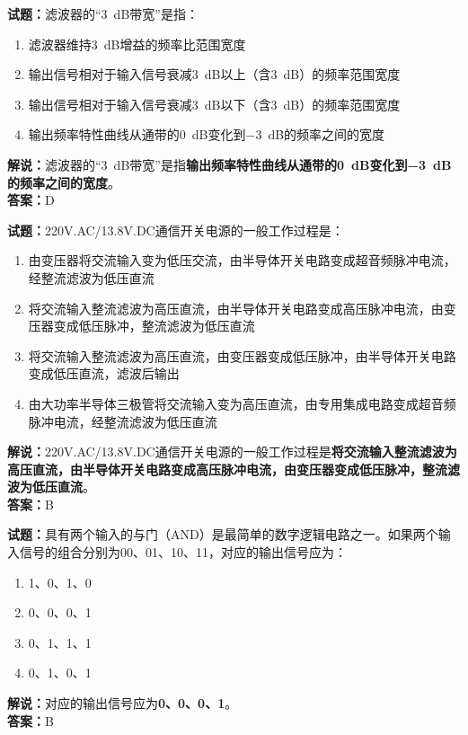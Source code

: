 \documentclass{ctexbook}
\begin{document}
\textbf{试题：}滤波器的“\SI{3}{\dB}带宽”是指：
\begin{enumerate}[leftmargin=3em]
  \item 滤波器维持\SI{3}{\dB}增益的频率比范围宽度
  \item 输出信号相对于输入信号衰减\SI{3}{\dB}以上（含\SI{3}{\dB}）的频率范围宽度
  \item 输出信号相对于输入信号衰减\SI{3}{\dB}以下（含\SI{3}{\dB}）的频率范围宽度
  \item 输出频率特性曲线从通带的\SI{0}{\dB}变化到\SI{-3}{\dB}的频率之间的宽度
\end{enumerate}
\noindent\textbf{解说：}滤波器的“\SI{3}{\dB}带宽”是指\textbf{输出频率特性曲线从通带的\SI{0}{\dB}变化到\SI{-3}{\dB}的频率之间的宽度}。\\\noindent\textbf{答案：}D

\vspace{1em}

\textbf{试题：}220V.AC/13.8V.DC通信开关电源的一般工作过程是：
\begin{enumerate}[leftmargin=3em]
  \item 由变压器将交流输入变为低压交流，由半导体开关电路变成超音频脉冲电流，经整流滤波为低压直流
  \item 将交流输入整流滤波为高压直流，由半导体开关电路变成高压脉冲电流，由变压器变成低压脉冲，整流滤波为低压直流
  \item 将交流输入整流滤波为高压直流，由变压器变成低压脉冲，由半导体开关电路变成低压直流，滤波后输出
  \item 由大功率半导体三极管将交流输入变为高压直流，由专用集成电路变成超音频脉冲电流，经整流滤波为低压直流
\end{enumerate}
\noindent\textbf{解说：}220V.AC/13.8V.DC通信开关电源的一般工作过程是\textbf{将交流输入整流滤波为高压直流，由半导体开关电路变成高压脉冲电流，由变压器变成低压脉冲，整流滤波为低压直流}。\\\noindent\textbf{答案：}B

\vspace{1em}

\textbf{试题：}具有两个输入的与门（AND）是最简单的数字逻辑电路之一。如果两个输入信号的组合分别为00、01、10、11，对应的输出信号应为：
\begin{enumerate}[leftmargin=3em]
  \item 1、0、1、0
  \item 0、0、0、1
  \item 0、1、1、1
  \item 0、1、0、1
\end{enumerate}
\noindent\textbf{解说：}对应的输出信号应为\textbf{0、0、0、1}。\\\noindent\textbf{答案：}B
\end{document}

